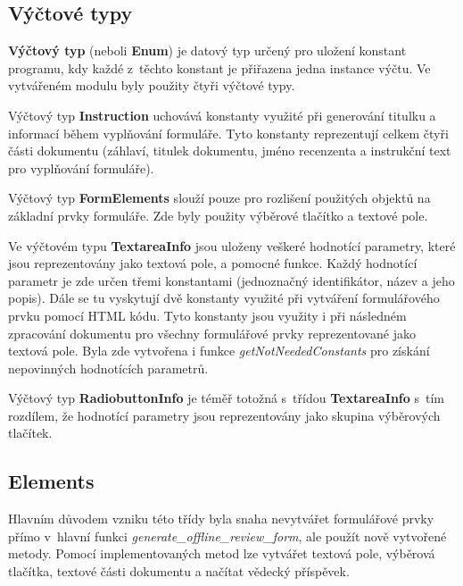 \subsection{Výčtové typy}
\textbf{Výčtový typ} (neboli \textbf{Enum}) je datový typ určený pro uložení konstant programu, kdy každé z~těchto konstant je přiřazena jedna instance výčtu. Ve vytvářeném modulu byly použity čtyři výčtové typy. 
\par
Výčtový typ \textbf{Instruction} uchovává konstanty využité při generování titulku a informací během vyplňování formuláře. Tyto konstanty reprezentují celkem čtyři části dokumentu (záhlaví, titulek dokumentu, jméno recenzenta a instrukční text pro vyplňování formuláře).
\par
Výčtový typ \textbf{FormElements} slouží pouze pro rozlišení použitých objektů na základní prvky formuláře. Zde byly použity výběrové tlačítko a textové pole.
\par
Ve výčtovém typu \textbf{TextareaInfo} jsou uloženy veškeré hodnotící parametry, které jsou reprezentovány jako textová pole, a pomocné funkce. Každý hodnotící parametr je zde určen třemi konstantami (jednoznačný identifikátor, název a jeho popis). Dále se tu vyskytují dvě konstanty využité při vytváření formulářového prvku pomocí HTML kódu. Tyto konstanty jsou využity i při následném zpracování dokumentu pro všechny formulářové prvky reprezentované jako textová pole. Byla zde vytvořena i funkce \textit{getNotNeededConstants} pro získání nepovinných hodnotících parametrů.
\par
Výčtový typ \textbf{RadiobuttonInfo} je téměř totožná s~třídou \textbf{TextareaInfo} s~tím rozdílem, že hodnotící parametry jsou reprezentovány jako skupina výběrových tlačítek.
\subsection{Elements}
Hlavním důvodem vzniku této třídy byla snaha nevytvářet formulářové prvky přímo v~hlavní funkci \textit{generate\_offline\_review\_form}, ale použít nově vytvořené metody. Pomocí implementovaných metod lze vytvářet textová pole, výběrová tlačítka, textové části dokumentu a načítat vědecký příspěvek.
